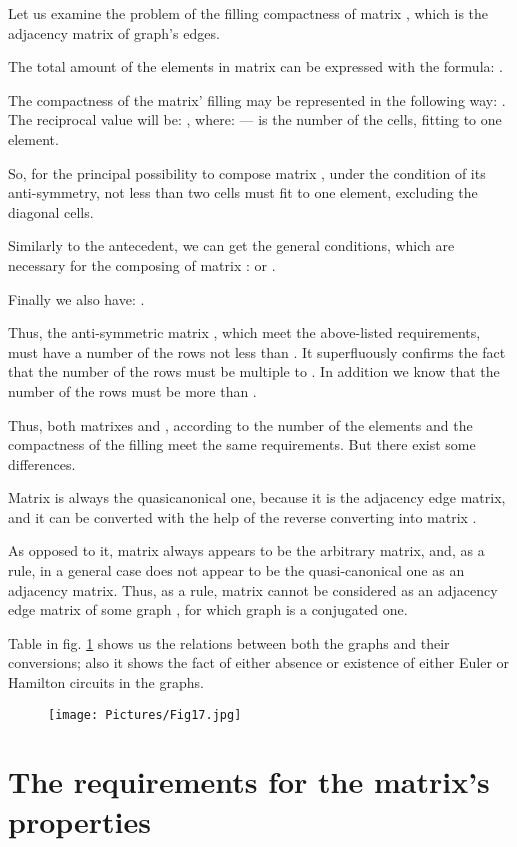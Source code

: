 \documentclass{amsart}
\theoremstyle{plain}
\numberwithin{equation}{section}
\begin{document}
Let us examine the problem of the filling compactness of matrix , which is the adjacency matrix of graph's  edges.

The total amount of the elements in matrix  can be expressed with the formula: .

The compactness of the matrix' filling may be represented in the following way: . The reciprocal value will be: , where:  --- is the number of the cells, fitting to one element.

So, for the principal possibility to compose matrix , under the condition of its anti-symmetry, not less than two cells must fit to one element, excluding the diagonal cells. 

Similarly to the antecedent, we can get the general conditions, which are necessary for the composing of matrix :  or .

Finally we also have: .

Thus, the anti-symmetric matrix , which meet the above-listed requirements, must have a number of the rows not less than . It superfluously confirms the fact that the number of the rows must be multiple to . In addition we know that the number of the rows must be more than .

Thus, both matrixes  and , according to the number of the elements and the compactness of the filling meet the same requirements. But there exist some differences.
 
Matrix  is always the quasicanonical one, because it is the adjacency edge matrix, and it can be converted with the help of the reverse converting  \cite {Malinin} into matrix .

As opposed to it, matrix  always appears to be the arbitrary matrix, and, as a rule, in a general case does not appear to be the quasi-canonical one as an adjacency matrix. Thus, as a rule, matrix  cannot be considered as an adjacency edge matrix of some graph , for which graph  is a conjugated one.

Table in fig. \ref{Fig:17} shows us the relations between both the graphs and their conversions; also it shows the fact of either absence or existence of either Euler or Hamilton circuits in the graphs. 

\begin{figure}[htb]
		\texttt{[image: Pictures/Fig17.jpg]}
	\caption{}
	\label{Fig:17}
\end{figure}

\section {The requirements for the matrix's  properties}
\end{document}
